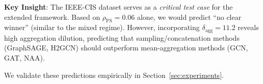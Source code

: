 \textbf{Key Insight}: The IEEE-CIS dataset serves as a \textit{critical test case} for the extended framework. Based on $\rho_{\text{FS}} = 0.06$ alone, we would predict ``no clear winner'' (similar to the mixed regime). However, incorporating $\delta_{\text{agg}} = 11.2$ reveals high aggregation dilution, predicting that sampling/concatenation methods (GraphSAGE, H2GCN) should outperform mean-aggregation methods (GCN, GAT, NAA).

We validate these predictions empirically in Section~\ref{sec:experiments}.
